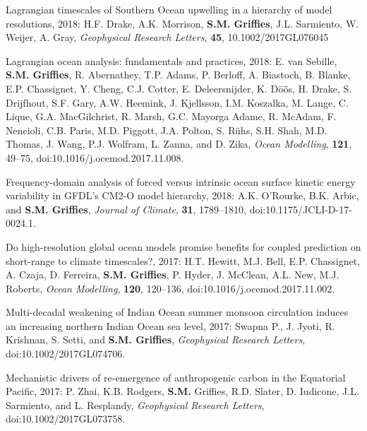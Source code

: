 \begin{etaremune}
\item Lagrangian timescales of Southern Ocean upwelling in a hierarchy of model resolutions, 2018: H.F. Drake, A.K. Morrison, {\bf  S.M. Grif\/f\/ies}, J.L. Sarmiento, W. Weijer, A. Gray, {\it  Geophysical Research Letters}, {\bf 45}, 10.1002/2017GL076045

\item  Lagrangian ocean analysis: fundamentals and practices, 2018: E. van Sebille, {\bf S.M. Grif\/f\/ies}, R. Abernathey, T.P. Adams, P. Berloff, A. Biastoch, B. Blanke, E.P. Chassignet, Y. Cheng, C.J. Cotter, E. Deleersnijder, K. {D\"{o}\"{o}̈s}, H. Drake, S. Drijfhout, S.F. Gary, A.W. Heemink, J. Kjellsson, I.M. Koszalka, M. Lange, C. Lique, G.A.  MacGilchrist, R. Marsh, G.C. Mayorga Adame, R. McAdam, F. Nencioli, C.B. Paris, M.D. Piggott, J.A. Polton, S. {R\"{u}hs}, S.H. Shah, M.D. Thomas, J. Wang, P.J. Wolfram, L. Zanna, and D. Zika, {\it Ocean Modelling},
{\bf 121}, 49--75,  doi:10.1016/j.ocemod.2017.11.008.

\item Frequency-domain analysis of forced versus intrinsic ocean surface kinetic energy variability in GFDL's CM2-O model hierarchy, 2018: A.K. O'Rourke, B.K. Arbic, and {\bf S.M. Grif\/f\/ies}, {\it Journal of Climate}, {\bf 31}, 1789--1810, doi:10.1175/JCLI-D-17-0024.1.

\item Do high-resolution global ocean models promise benefits for coupled prediction on short-range to climate timescales?, 2017: H.T. Hewitt, M.J. Bell, E.P. Chassignet, A. Czaja, D. Ferreira, {\bf S.M. Grif\/f\/ies}, P. Hyder, J. McClean, A.L. New, M.J. Roberts, {\it Ocean Modelling}, {\bf 120}, 120--136, doi:10.1016/j.ocemod.2017.11.002.

\item Multi-decadal weakening of Indian Ocean summer monsoon circulation induces an increasing northern Indian Ocean sea level, 2017: Swapna P., J. Jyoti, R. Krishnan, S. Setti, and {\bf  S.M. Grif\/f\/ies}, {\it Geophysical Research  Letters}, \newline doi:10.1002/2017GL074706.



\item Mechanistic drivers of re-emergence of anthropogenic carbon in the Equatorial Pacific, 2017: P. Zhai, K.B. Rodgers, {\bf S.M.} Grif\/fies, R.D. Slater, D. Iudicone, J.L. Sarmiento, and L. Resplandy, {\it Geophysical Research Letters}, doi:10.1002/2017GL073758.


\end{etaremune}
